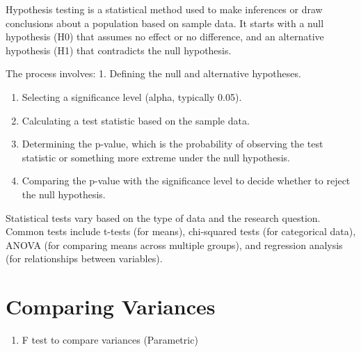 \documentclass[
]{book}
\providecommand{\tightlist}{%
  \setlength{\itemsep}{0pt}\setlength{\parskip}{0pt}}
\begin{document}
Hypothesis testing is a statistical method used to make inferences or draw conclusions about a population based on sample data. It starts with a null hypothesis (H0) that assumes no effect or no difference, and an alternative hypothesis (H1) that contradicts the null hypothesis.

The process involves:
1. Defining the null and alternative hypotheses.

\begin{enumerate}
\def\labelenumi{\arabic{enumi}.}
\setcounter{enumi}{1}
\item
  Selecting a significance level (alpha, typically 0.05).
\item
  Calculating a test statistic based on the sample data.
\item
  Determining the p-value, which is the probability of observing the test statistic or something more extreme under the null hypothesis.
\item
  Comparing the p-value with the significance level to decide whether to reject the null hypothesis.
\end{enumerate}

Statistical tests vary based on the type of data and the research question. Common tests include t-tests (for means), chi-squared tests (for categorical data), ANOVA (for comparing means across multiple groups), and regression analysis (for relationships between variables).

\section*{Comparing Variances}\label{comparing-variances}

\begin{enumerate}
\def\labelenumi{\alph{enumi}.}
\tightlist
\item
  F test to compare variances (Parametric)
\end{enumerate}
\end{document}
